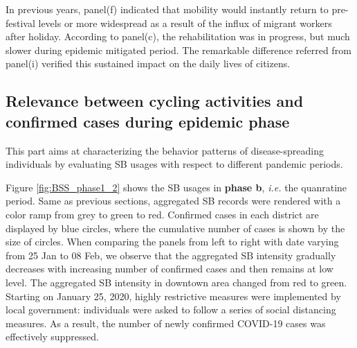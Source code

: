 \documentclass[preprints,ijgi,submit,moreauthors]{Definitions/mdpi}
\begin{document}
In previous years, panel(f) indicated that mobility would instantly return to pre-festival levels or more widespread as a result of the influx of migrant workers after holiday.
According to panel(c), the rehabilitation was in progress, but much slower during epidemic mitigated period.
The remarkable difference referred from panel(i) verified this sustained impact on the daily lives of citizens.

\subsection{Relevance between cycling activities and confirmed cases during epidemic phase} 

This part aims at characterizing the behavior patterns of disease-spreading individuals by evaluating SB usages with respect to different pandemic periods.%

Figure \ref{fig:BSS_phase1_2} shows the SB usages in \textbf{phase b}, \textit{i.e.} the quanratine period.
Same as previous sections, aggregated SB records were rendered with a color ramp from grey to green to red.
Confirmed cases in each district are displayed by blue circles, where the cumulative number of cases is shown by the size of circles.
When comparing the panels from left to right with date varying from 25 Jan to 08 Feb, we observe that the aggregated SB intensity gradually decreases with increasing number of confirmed cases and then remains at low level.
The aggregated SB intensity in downtown area changed from red to green.
Starting on January 25, 2020, highly restrictive measures were implemented by local government: individuals were asked to follow a series of social distancing measures.
As a result, the number of newly confirmed COVID-19 cases was effectively suppressed.
\end{document}
